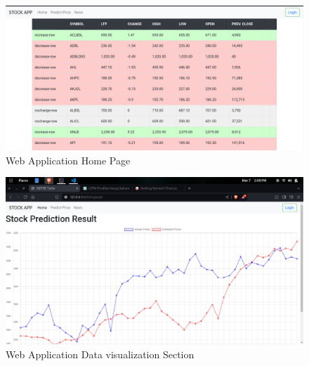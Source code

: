 \documentclass[./main.tex]{subfiles}
\begin{document}
\begin{figure}[H]
    \centering
    \includegraphics[width=1\linewidth]{images/web1.png}
    \caption{Web Application Home Page}
    \label{fig:7.6}

\end{figure}
\begin{figure}[H]
    \centering
    \includegraphics[width=1\linewidth]{images/web2.png}
    \caption{Web Application Data visualization Section}
    \label{fig:7.7}
\end{figure}
\end{document}
